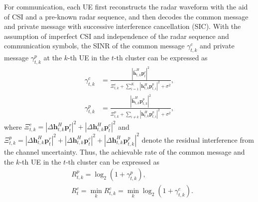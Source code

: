 \documentclass[twocolumn,journal]{IEEEtran}
\begin{document}
For communication, each UE first reconstructs the radar waveform with the aid of CSI and a pre-known radar sequence, and then decodes the common message and private message with successive interference cancellation (SIC). With the assumption of imperfect CSI and independence of the radar sequence and communication symbols, the SINR of the common message \(\gamma^{c}_{t,k}\) and private message \(\gamma^{p}_{t,k}\) at the \(k\)-th UE in the \(t\)-th cluster can be expressed as \cite{leeMaxMin2023}
\begin{subequations}
\begin{align}
    \gamma^{c}_{t,k} &= \frac{\left| \hat{\boldsymbol{h}}^{H}_{t,k}\boldsymbol{p}^{c}_{t} \right|^2}{\Xi^{c}_{t,k}+  \sum_{i=1}^{K}\left| \boldsymbol{h}^{H}_{t,k}\boldsymbol{p}^{p}_{t,i}\right|^2 + \sigma^2},\\
    \gamma^{p}_{t,k} &= \frac{\left| \hat{\boldsymbol{h}}^{H}_{t,k}\boldsymbol{p}^{p}_{t,k} \right|^2}{\Xi^{p}_{t,k} +\sum_{i\neq k}\left| \boldsymbol{h}^{H}_{t,k}\boldsymbol{p}^{p}_{t,i}\right|^2 + \sigma^2},
\end{align}
\end{subequations}
where \(\Xi^{c}_{t,k}=\left| \Delta\boldsymbol{h}^{H}_{t,k}\boldsymbol{p}^{r}_{t}\right|^2 +\left| \Delta\boldsymbol{h}^{H}_{t,k}\boldsymbol{p}^{c}_{t}\right|^2\) and \(\Xi^{p}_{t,k}=\left| \Delta\boldsymbol{h}^{H}_{t,k}\boldsymbol{p}^{r}_{t}\right|^2 + \left| \Delta\boldsymbol{h}^{H}_{t,k}\boldsymbol{p}^{c}_{t}\right|^2 + \left| \Delta\boldsymbol{h}^{H}_{t,k}\boldsymbol{p}^{p}_{t,k}\right|^2\) denote the residual interference from the channel uncertainty.
Thus, the achievable rate of the common message and the \(k\)-th UE in the \(t\)-th cluster can be expressed as
\begin{subequations}
\begin{align}
    &R^{p}_{t,k} = \log_2(1 + \gamma^{p}_{t,k}),\\
    &R^{c}_{t}   = \min_{k} R^{c}_{t,k}= \min_{k} \log_2(1 + \gamma^{c}_{t,k}).
\end{align}    
\end{subequations}
\end{document}
